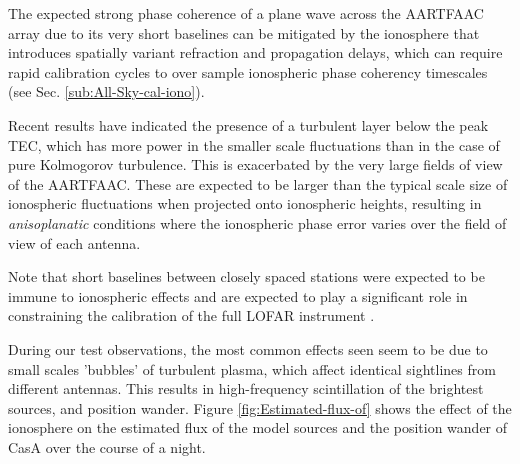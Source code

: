 \documentclass[referee]{aa}
\begin{document}
The expected  strong phase coherence of  a plane wave across  the AARTFAAC array
due  to  its very  short  baselines  can be  mitigated  by  the ionosphere  that
introduces  spatially  variant  refraction  and propagation  delays,  which  can
require  rapid calibration  cycles to  over sample  ionospheric  phase coherency
timescales (see Sec. \ref{sub:All-Sky-cal-iono}).

Recent results \citep{intema2009ionospheric} have indicated the  presence
of a  turbulent layer below  the peak  TEC, which has  more power in  the smaller
scale  fluctuations than in  the case  of pure  Kolmogorov turbulence.   This is
exacerbated by the very large fields  of view of the \mbox{AARTFAAC}.  These are
expected to  be larger than the  typical scale size  of ionospheric fluctuations
when  projected  onto  ionospheric  heights,  resulting  in  \emph{anisoplanatic
}conditions where the  ionospheric phase error varies over the  field of view of
each antenna.

Note that  short baselines between closely  spaced stations were  expected to be
immune to  ionospheric effects and are  expected to play a  significant role in
constraining    the     calibration    of    the     full    LOFAR    instrument
\citep{vdTol2007selfcallofar}.

During our  test observations, the  most common effects  seen seem to be  due to
small scales  'bubbles' of turbulent  plasma, which affect  identical sightlines
from different  antennas.  This results  in high-frequency scintillation  of the
brightest  sources,  and  position wander.   Figure  \ref{fig:Estimated-flux-of}
shows the  effect of the ionosphere on  the estimated flux of  the model sources
and the position wander of CasA over the course of a night.
\end{document}

